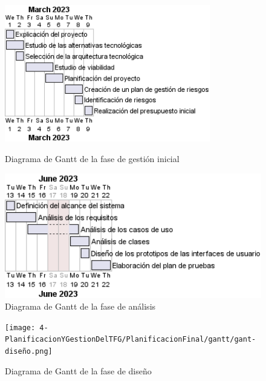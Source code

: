 \begin{figure}[H]
	\centering
	\begin{minipage}{0.45\textwidth}
		\includegraphics[width=0.8\textwidth]{4-PlanificacionYGestionDelTFG/PlanificacionFinal/gantt/gant-gestionInicial.png}
		\caption{Diagrama de Gantt de la fase de gestión inicial}
	\end{minipage}
	\hfill
	\begin{minipage}{0.45\textwidth}
		\includegraphics[width=1\textwidth]{4-PlanificacionYGestionDelTFG/PlanificacionFinal/gantt/gant-analisis.png}
		\caption{Diagrama de Gantt de la fase de análisis}
	\end{minipage}
\end{figure}

\begin{figure}[H]
	\texttt{[image: 4-PlanificacionYGestionDelTFG/PlanificacionFinal/gantt/gant-diseño.png]}
	\caption{Diagrama de Gantt de la fase de diseño}
\end{figure}

